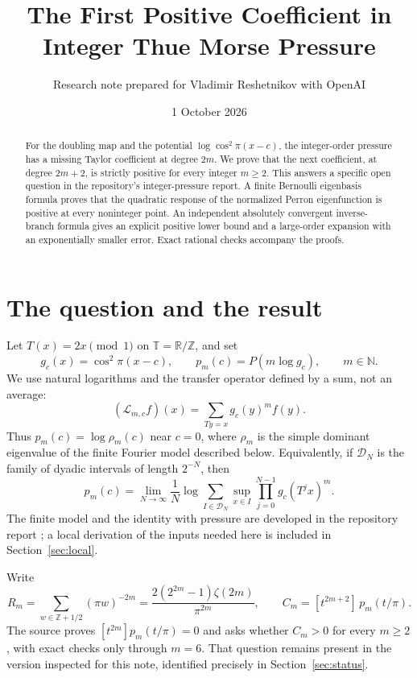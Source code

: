\documentclass[11pt,a4paper]{article}
\title{The First Positive Coefficient in Integer Thue Morse Pressure}
\author{Research note prepared for Vladimir Reshetnikov with OpenAI}
\date{1 October 2026}
\theoremstyle{remark}\newtheorem*{ednote}{Editorial note (ProveIt, 2026-10-01)}
\newcommand{\Z}{\mathbb Z}\newcommand{\T}{\mathbb T}\newcommand{\E}{\mathcal E}
\newcommand{\Lop}{\mathcal L}\newcommand{\ii}{\mathrm i}
\begin{document}
\maketitle
\begin{abstract}
For the doubling map and the potential $\log\cos^2\!\pi(x-c)$, the integer-order pressure has a missing Taylor coefficient at degree $2m$. We prove that the next coefficient, at degree $2m+2$, is strictly positive for every integer $m\ge2$. This answers a specific open question in the repository's integer-pressure report. A finite Bernoulli eigenbasis formula proves that the quadratic response of the normalized Perron eigenfunction is positive at every noninteger point. An independent absolutely convergent inverse-branch formula gives an explicit positive lower bound and a large-order expansion with an exponentially smaller error. Exact rational checks accompany the proofs.
\end{abstract}

\section{The question and the result}
Let $T(x)=2x\pmod1$ on $\T=\mathbb R/\Z$, and set
\[
 g_c(x)=\cos^2\!\pi(x-c),\qquad p_m(c)=P(m\log g_c),\qquad m\in\mathbb N.
\]
We use natural logarithms and the transfer operator defined by a sum, not an average:
\begin{equation}\label{eq:L}
 (\Lop_{m,c}f)(x)=\sum_{Ty=x}g_c(y)^m f(y).
\end{equation}
Thus $p_m(c)=\log\rho_m(c)$ near $c=0$, where $\rho_m$ is the simple dominant eigenvalue of the finite Fourier model described below. Equivalently, if $\mathcal D_N$ is the family of dyadic intervals of length $2^{-N}$, then
\[
 p_m(c)=\lim_{N\to\infty}\frac1N\log\sum_{I\in\mathcal D_N}
 \sup_{x\in I}\prod_{j=0}^{N-1}g_c(T^jx)^m.
\]
The finite model and the identity with pressure are developed in the repository report \cite{integer}; a local derivation of the inputs needed here is included in Section~\ref{sec:local}.

Write
\begin{equation}\label{eq:R}
 R_m=\sum_{w\in\Z+1/2}(\pi w)^{-2m}
     =\frac{2(2^{2m}-1)\zeta(2m)}{\pi^{2m}},\qquad
 C_m=[t^{2m+2}]\,p_m(t/\pi).
\end{equation}
The source proves $[t^{2m}]p_m(t/\pi)=0$ and asks whether $C_m>0$ for every $m\ge2$, with exact checks only through $m=6$. That question remains present in the version inspected for this note, identified precisely in Section~\ref{sec:status}.
\end{document}
